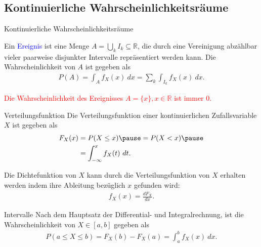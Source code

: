 \documentclass{beamer}
\def\padding{\vspace{0.5cm}}
\def\spadding{\vspace{0.25cm}}
\def\b{\textcolor{blue}}
\def\r{\textcolor{red}}
\begin{document}
\subsection{Kontinuierliche Wahrscheinlichkeitsräume}
\begin{frame}{Kontinuierliche Wahrscheinlichkeitsräume}
    \begin{definition}
        Ein \b{Ereignis} ist eine Menge $A = \bigcup_k I_k \subseteq \mathbb{R}$, die durch eine Vereinigung abzählbar vieler paarweise disjunkter Intervalle repräsentiert werden kann. Die Wahrscheinlichkeit von $A$ ist gegeben als
        \begin{align*}
            P(A) = \int_A f_X(x)\ dx = \sum_k \int_{I_k} f_X(x)\ dx.
        \end{align*}
    \end{definition}\pause\par\padding
    \r{Die Wahrscheinlichkeit des Ereignisses $A = \{x\}, x \in \mathbb{R}$ ist immer $0$.}
\end{frame}

\begin{frame}
    \begin{block}{Verteilungsfunktion}
        Die Verteilungsfunktion einer kontinuierlichen Zufallsvariable $X$ ist gegeben als
        \begin{align*}
            F_X(x) &= P(X \leq x)\pause = P(X < x)\pause \\
                   &= \int_{- \infty}^x f_X(t)\ dt.
        \end{align*}\pause\par\spadding
        Die Dichtefunktion von $X$ kann durch die Verteilungsfunktion von $X$ erhalten werden indem ihre Ableitung bezüglich $x$ gefunden wird:
        \begin{align*}
            f_X(x) = \frac{dF_X}{dx}.
        \end{align*}
    \end{block}
\end{frame}

\begin{frame}
    \begin{block}{Intervalle}
        Nach dem Hauptsatz der Differential- und Integralrechnung, ist die Wahrscheinlichkeit von $X \in [a,b]$ gegeben als
        \begin{align*}
            P(a \leq X \leq b) = F_X(b) - F_X(a) = \int_a^b f_X(x)\ dx.
        \end{align*}
    \end{block}
\end{frame}
\end{document}
